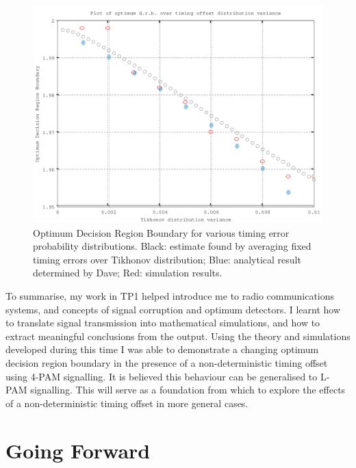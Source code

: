 \begin{figure}[htbp]
\centering
\includegraphics[width=\linewidth]{../../../plots/opt_dec_reg.png}
\caption{Optimum Decision Region Boundary for various timing error
probability distributions. Black: estimate found by averaging fixed timing errors over Tikhonov distribution; Blue: analytical result determined by Dave; Red: simulation results.}
\end{figure}

To summarise, my work in TP1 helped introduce me to radio communications
systems, and concepts of signal corruption and optimum detectors. I
learnt how to translate signal transmission into mathematical
simulations, and how to extract meaningful conclusions from the output.
Using the theory and simulations developed during this time I was able
to demonstrate a changing optimum decision region boundary in the
presence of a non-deterministic timing offset using 4-PAM signalling. It
is believed this behaviour can be generalised to L-PAM signalling.  This will serve as a foundation from which to explore the effects of a
non-deterministic timing offset in more general cases.


\part{Going Forward}

